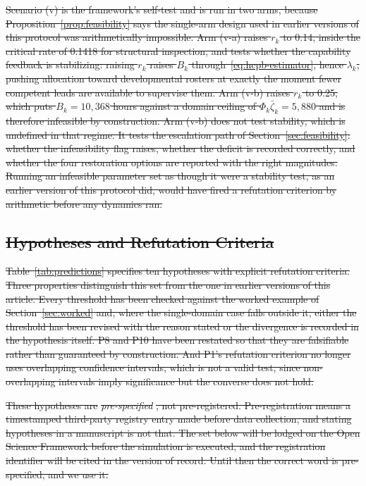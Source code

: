 \documentclass[utf8]{FrontiersinHarvard}
\providecommand{\DIFdel}[1]{{\protect\color{red}\sout{#1}}}                      %
\begin{document}
\DIFdel{Scenario (v) is the framework's self-test and is run in two arms, because Proposition~\ref{prop:feasibility} says the single-arm design used in earlier versions of this protocol was arithmetically impossible. Arm (v-a) raises $r_k$ to 0.14, inside the critical rate of 0.1418 for structural inspection, and tests whether the capability feedback is stabilizing: raising $r_k$ raises $B_k$ through~\eqref{eq:hcpb-estimator}, hence $\lambda_k$, pushing allocation toward developmental rosters at exactly the moment fewer competent leads are available to supervise them. Arm (v-b) raises $r_k$ to 0.25, which puts $B_k = 10{,}368$ hours against a domain ceiling of $\Phi_k\bar\zeta_k = 5{,}880$ and is therefore infeasible by construction. Arm (v-b) does not test stability, which is undefined in that regime. It tests the escalation path of Section~\ref{sec:feasibility}: whether the infeasibility flag raises, whether the deficit is recorded correctly, and whether the four restoration options are reported with the right magnitudes. Running an infeasible parameter set as though it were a stability test, as an earlier version of this protocol did, would have fired a refutation criterion by arithmetic before any dynamics ran.
	}%

\subsection{\DIFdel{Hypotheses and Refutation Criteria}}
\addtocounter{subsection}{-1}%

\DIFdel{Table~\ref{tab:predictions} specifies ten hypotheses with explicit refutation criteria. Three properties distinguish this set from the one in earlier versions of this article. Every threshold has been checked against the worked example of Section~\ref{sec:worked} and, where the single-domain case falls outside it, either the threshold has been revised with the reason stated or the divergence is recorded in the hypothesis itself. P8 and P10 have been restated so that they are falsifiable rather than guaranteed by construction. And P1's refutation criterion no longer uses overlapping confidence intervals, which is not a valid test, since non-overlapping intervals imply significance but the converse does not hold.
	}%

\DIFdel{These hypotheses are }\textit{\DIFdel{pre-specified}}%
\DIFdel{, not pre-registered. Pre-registration means a timestamped third-party registry entry made before data collection, and stating hypotheses in a manuscript is not that. The set below will be lodged on the Open Science Framework before the simulation is executed, and the registration identifier will be cited in the version of record. Until then the correct word is pre-specified, and we use it.
	}%
\end{document}
